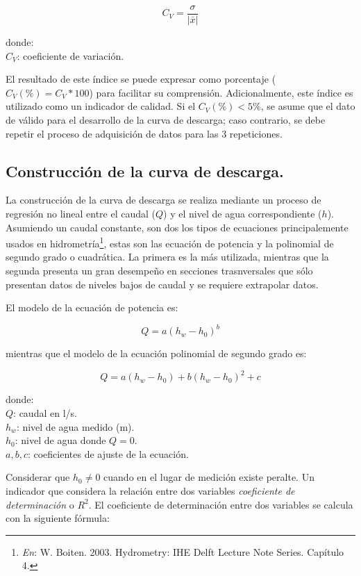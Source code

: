 \documentclass[]{article}
\let\rmarkdownfootnote\footnote%
\def\footnote{\protect\rmarkdownfootnote}
\begin{document}
\[{C_V} = \frac{\sigma }{{\left| {\bar x} \right|}}\]

donde:\\
\(C_V\): coeficiente de variación.

El resultado de este índice se puede expresar como porcentaje
(\({C_V}(\%) = {C_V}*100\)) para facilitar su comprensión.
Adicionalmente, este índice es utilizado como un indicador de calidad.
Si el \({C_V}(\%) < 5\%\), se asume que el dato de válido para el
desarrollo de la curva de descarga; caso contrario, se debe repetir el
proceso de adquisición de datos para las 3 repeticiones.

\subsection{Construcción de la curva de
descarga.}\label{construccion-de-la-curva-de-descarga.}

La construcción de la curva de descarga se realiza mediante un proceso
de regresión no lineal entre el caudal (\(Q\)) y el nivel de agua
correspondiente (\(h\)). Asumiendo un caudal constante, son dos los
tipos de ecuaciones principalemente usados en hidrometría\footnote{\emph{En}:
  W. Boiten. 2003. Hydrometry: IHE Delft Lecture Note Series. Capítulo
  4.}, estas son las ecuación de potencia y la polinomial de segundo
grado o cuadrática. La primera es la más utilizada, mientras que la
segunda presenta un gran desempeño en secciones trasnversales que sólo
presentan datos de niveles bajos de caudal y se requiere extrapolar
datos.

El modelo de la ecuación de potencia es:

\[Q = a{(h_w - h_0)^b}\]

mientras que el modelo de la ecuación polinomial de segundo grado es:

\[Q = a(h_w - h_0) + b{(h_w - h_0)^2} + c\]

donde:\\
\(Q\): caudal en l/s.\\
\(h_w\): nivel de agua medido (m).\\
\(h_0\): nivel de agua donde \(Q = 0\).\\
\(a, b, c\): coeficientes de ajuste de la ecuación.

Considerar que \(h_0 \ne 0\) cuando en el lugar de medición existe
peralte. Un indicador que considera la relación entre dos variables
\emph{coeficiente de determinación} o \(R^2\). El coeficiente de
determinación entre dos variables se calcula con la siguiente fórmula:
\end{document}
